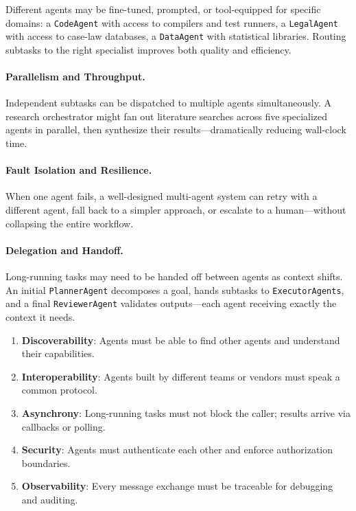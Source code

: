 Different agents may be fine-tuned, prompted, or tool-equipped for specific domains: a \texttt{CodeAgent} with access to compilers and test runners, a \texttt{LegalAgent} with access to case-law databases, a \texttt{DataAgent} with statistical libraries. Routing subtasks to the right specialist improves both quality and efficiency.

\paragraph{Parallelism and Throughput.}
\label{parallelism-and-throughput.}

Independent subtasks can be dispatched to multiple agents simultaneously. A research orchestrator might fan out literature searches across five specialized agents in parallel, then synthesize their results---dramatically reducing wall-clock time.

\paragraph{Fault Isolation and Resilience.}
\label{fault-isolation-and-resilience.}

When one agent fails, a well-designed multi-agent system can retry with a different agent, fall back to a simpler approach, or escalate to a human---without collapsing the entire workflow.

\paragraph{Delegation and Handoff.}
\label{delegation-and-handoff.}

Long-running tasks may need to be handed off between agents as context shifts. An initial \texttt{PlannerAgent} decomposes a goal, hands subtasks to \texttt{ExecutorAgents}, and a final \texttt{ReviewerAgent} validates outputs---each agent receiving exactly the context it needs.

\begin{keybox}
\begin{enumerate}
  \item \textbf{Discoverability}: Agents must be able to find other agents and understand their capabilities.
  \item \textbf{Interoperability}: Agents built by different teams or vendors must speak a common protocol.
  \item \textbf{Asynchrony}: Long-running tasks must not block the caller; results arrive via callbacks or polling.
  \item \textbf{Security}: Agents must authenticate each other and enforce authorization boundaries.
  \item \textbf{Observability}: Every message exchange must be traceable for debugging and auditing.
\end{enumerate}
\end{keybox}

